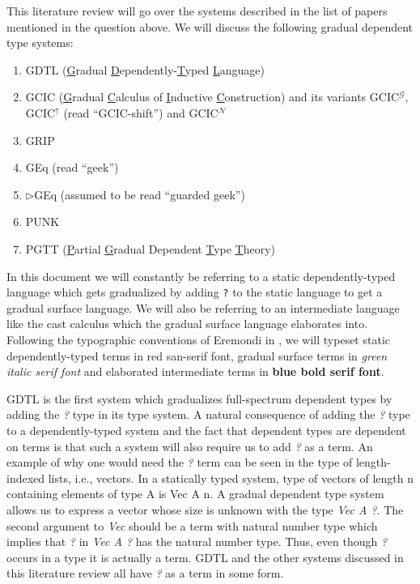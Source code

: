 \documentclass{article}
\newcommand{\Scode}[1]{{\fontfamily{cmss}\selectfont\color{Mahogany}#1}}
\newcommand{\Gcode}[1]{{\color{OliveGreen}\textit{#1}}}
\newcommand{\Ccode}[1]{{\color{BlueViolet}\textbf{#1}}}
\newcommand{\GCICN}[0]{GCIC\(^\mathcal{N}\)}
\newcommand{\GCICG}[0]{GCIC\(^\mathcal{G}\)}
\newcommand{\GCICS}[0]{GCIC\(^\uparrow\)}
\newcommand{\GGEq}[0]{\(\triangleright\)GEq}
\begin{document}
This literature review will go over the systems described in the list of papers
mentioned in the question above. We will discuss the following gradual dependent
type systems:
\begin{enumerate}
  \item GDTL (\underline{G}radual \underline{D}ependently-\underline{T}yped
    \underline{L}anguage) \cite{eremondi_approximate_2019}\cite{eremondi_design_2023}
  \item GCIC (\underline{G}radual \underline{C}alculus of \underline{I}nductive
    \underline{C}onstruction) and its variants \GCICG{}, \GCICS{} (read
    ``GCIC-shift'') and \GCICN{}\cite{lennon-bertrand_gradualizing_2022}
  \item GRIP\cite{maillard_reasonably_2022}
  \item GEq (read
    ``geek'')\cite{eremondi_propositional_2022}\cite{eremondi_design_2023}
  \item \GGEq{}\cite{eremondi_design_2023} (assumed to be read
    ``guarded geek'')
  \item PUNK\cite{malewski_gradual_2024}
  \item PGTT (\underline{P}artial \underline{G}radual Dependent \underline{T}ype
    \underline{T}heory)\cite{shi_partial_2023}
\end{enumerate}

In this document we will constantly be referring to a static dependently-typed
language which gets gradualized by adding \verb|?| to the static language to get
a gradual surface language. We will also be referring to an intermediate
language like the cast calculus which the gradual surface language elaborates
into. Following the typographic conventions of Eremondi in
\cite{eremondi_design_2023}, we will typeset static dependently-typed terms in
\Scode{red san-serif font}, gradual surface terms in \Gcode{green italic serif
  font} and elaborated intermediate terms in \Ccode{blue bold serif font}.

GDTL is the first system which gradualizes full-spectrum dependent types by
adding the \Gcode{?} type in its type
system.\cite{eremondi_approximate_2019}\cite{lennon-bertrand_gradualizing_2022}
A natural consequence of adding the \Gcode{?} type to a dependently-typed system
and the fact that dependent types are dependent on terms is that such a system
will also require us to add \Gcode{?} as a term. An example of why one would
need the \Gcode{?} term can be seen in the type of length-indexed lists, i.e.,
vectors. In a statically typed system, type of vectors of length \Scode{n}
containing elements of type \Scode{A} is \Scode{Vec A n}. A gradual dependent
type system allows us to express a vector whose size is unknown with the type
\Gcode{Vec A ?}. The second argument to \Gcode{Vec} should be a term with
natural number type which implies that \Gcode{?} in \Gcode{Vec A ?} has the
natural number type. Thus, even though \Gcode{?} occurs in a type it is actually
a term. GDTL and the other systems discussed in this literature review all have
\Gcode{?} as a term in some form.
\end{document}
